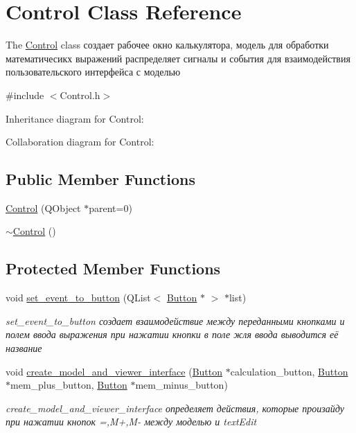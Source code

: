 \hypertarget{classControl}{}\section{Control Class Reference}
\label{classControl}


The \hyperlink{classControl}{Control} class создает рабочее окно калькулятора, модель для обработки математичесикх выражений распределяет сигналы и события для взаимодействия пользовательского интерфейса с моделью  




{\ttfamily \#include $<$Control.\+h$>$}



Inheritance diagram for Control\+:


Collaboration diagram for Control\+:
\subsection*{Public Member Functions}
\begin{DoxyCompactItemize}
\item 
\hyperlink{classControl_a871ce0e5519b1b67b9d785accddee746}{Control} (Q\+Object $\ast$parent=0)
\item 
\hyperlink{classControl_aedda1328c4f8b8d49bca8f0812d3bfd1}{$\sim$\+Control} ()
\end{DoxyCompactItemize}
\subsection*{Protected Member Functions}
\begin{DoxyCompactItemize}
\item 
void \hyperlink{classControl_aba9a456fd0d24c077a1fae770af7762c}{set\+\_\+event\+\_\+to\+\_\+button} (Q\+List$<$ \hyperlink{classButton}{Button} $\ast$ $>$ $\ast$list)
\begin{DoxyCompactList}\small\item\em set\+\_\+event\+\_\+to\+\_\+button создает взаимодействие между переданными кнопками и полем ввода выражения при нажатии кнопки в поле жля ввода выводится её название \end{DoxyCompactList}\item 
void \hyperlink{classControl_ad8aef81d3de013b05ce3ac57fea217af}{create\+\_\+model\+\_\+and\+\_\+viewer\+\_\+interface} (\hyperlink{classButton}{Button} $\ast$calculation\+\_\+button, \hyperlink{classButton}{Button} $\ast$mem\+\_\+plus\+\_\+button, \hyperlink{classButton}{Button} $\ast$mem\+\_\+minus\+\_\+button)
\begin{DoxyCompactList}\small\item\em create\+\_\+model\+\_\+and\+\_\+viewer\+\_\+interface определяет действия, которые произайду при нажатии кнопок \textquotesingle{}=\textquotesingle{},\textquotesingle{}M+\textquotesingle{},\textquotesingle{}M-\/\textquotesingle{} между моделью и text\+Edit \end{DoxyCompactList}\end{DoxyCompactItemize}
